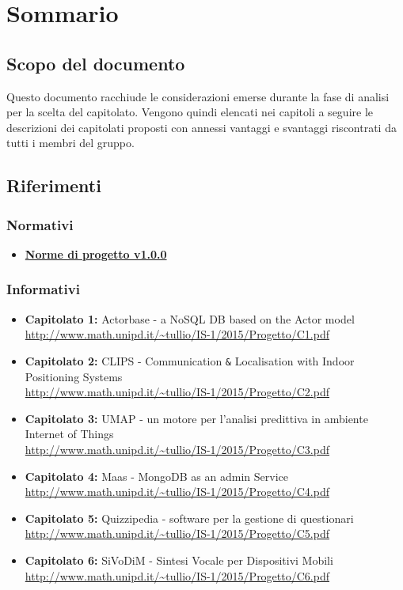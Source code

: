 \documentclass{scalatekids-article}
\begin{document}
\section{Sommario}
\subsection{Scopo del documento}
Questo documento racchiude le considerazioni emerse durante la fase di analisi per la scelta del capitolato.
Vengono quindi elencati nei capitoli a seguire le descrizioni dei capitolati proposti con annessi vantaggi e svantaggi riscontrati da tutti i membri del gruppo.
\prodPurpose
\glossExpl
\subsection{Riferimenti}
\subsubsection{Normativi}
\begin{itemize}
\item \href{run:NormeDiProgetto_v0.0.1.tex}{\textbf{Norme di progetto v1.0.0}}
\end{itemize}
\subsubsection{Informativi}
\begin{itemize}
\item \textbf{Capitolato 1:} Actorbase - a NoSQL DB based on the Actor model\\
  \url{http://www.math.unipd.it/~tullio/IS-1/2015/Progetto/C1.pdf}
\item \textbf{Capitolato 2:} CLIPS - Communication \verb=&= Localisation with Indoor Positioning Systems\\
  \url{http://www.math.unipd.it/~tullio/IS-1/2015/Progetto/C2.pdf}
\item \textbf{Capitolato 3:} UMAP - un motore per l'analisi predittiva in ambiente Internet of Things \\
  \url{http://www.math.unipd.it/~tullio/IS-1/2015/Progetto/C3.pdf}
\item \textbf{Capitolato 4:} Maas - MongoDB as an admin Service \\
  \url{http://www.math.unipd.it/~tullio/IS-1/2015/Progetto/C4.pdf}
\item \textbf{Capitolato 5:} Quizzipedia - software per la gestione di questionari \\
  \url{http://www.math.unipd.it/~tullio/IS-1/2015/Progetto/C5.pdf}
\item \textbf{Capitolato 6:} SiVoDiM - Sintesi Vocale per Dispositivi Mobili \\
  \url{http://www.math.unipd.it/~tullio/IS-1/2015/Progetto/C6.pdf}
\end{itemize}
\end{document}
